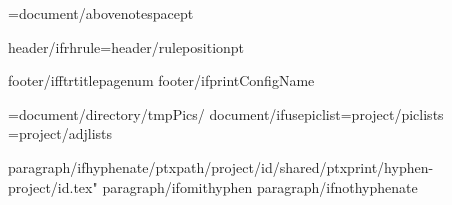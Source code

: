 \AboveNoteSpace={document/abovenotespace}pt

\def\HeaderPosition{{{header/headerposition}}}
\def\FooterPosition{{{header/footerposition}}}
{header/ifrhrule}\RHruleposition={header/ruleposition}pt
\def\RangeSeparator{{\kern.1em\char"2013\kern.1em}} %
\def\ChapterVerseSeparator{{\kern.02em{header/chvseparator}\kern.02em}} %

\def\RHoddleft{{{header/oddleft}}}
\def\RHoddcenter{{{header/oddcenter}}}
\def\RHoddright{{{header/oddright}}}

\def\RHevenleft{{{header/evenleft}}}
\def\RHevencenter{{{header/evencenter}}}
\def\RHevenright{{{header/evenright}}}


\def\RFoddcenter{{{footer/oddcenter}}}
\def\RFevencenter{{{footer/oddcenter}}}
\def\RFtitlecenter{{{footer/oddcenter}}}
{footer/ifftrtitlepagenum}\def\RFtitlecenter{{\pagenumber}}
{footer/ifprintConfigName}\def\RFtitlecenter{{{config/name}}}

\PicPath={{{document/directory}/tmpPics/}}
{document/ifusepiclist}\PicListPath={{{project/piclists}}}
\AdjListPath={{{project/adjlists}}}

\def\b{{\par\vskip\baselineskip}}
\let\pb=\pagebreak


{paragraph/ifhyphenate}{/ptxpath}/{project/id}/shared/ptxprint/hyphen-{project/id}.tex"
{paragraph/ifomithyphen}
{paragraph/ifnothyphenate}


